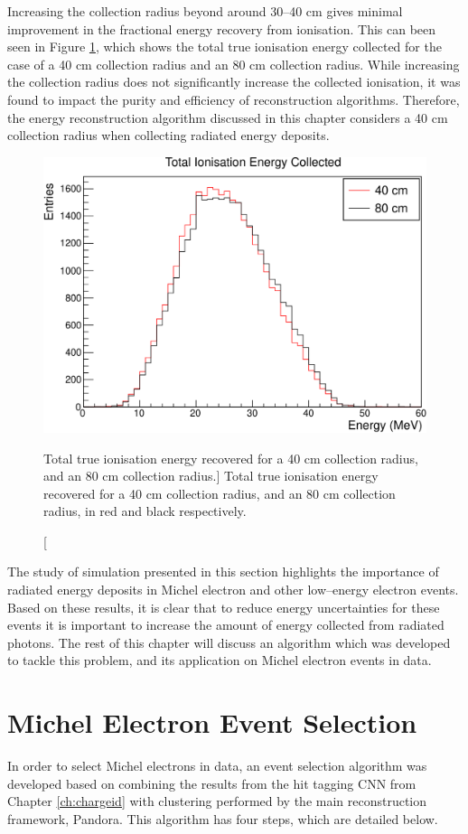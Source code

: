 Increasing the collection radius beyond around 30--40 cm gives minimal
improvement in the fractional energy recovery from ionisation. This can been
seen in Figure \ref{fig:40_v_80}, which shows the total true ionisation energy
collected for the case of a 40 cm collection radius and an 80 cm collection
radius. While increasing the collection radius does not significantly increase
the collected ionisation, it was found to impact the purity and efficiency of
reconstruction algorithms. Therefore, the energy reconstruction algorithm
discussed in this chapter considers a 40 cm collection radius when collecting
radiated energy deposits.
\begin{figure}
	\centering
	\includegraphics[width=\textwidth]{figures/40_v_80.pdf}
	\caption
	[Total true ionisation energy recovered for a 40 cm collection radius, and an
	80 cm collection radius.]
	{Total true ionisation energy recovered for a 40 cm collection radius, and an
	80 cm collection radius, in red and black respectively.}
	\label{fig:40_v_80}
\end{figure}

The study of \protodune{} simulation presented in this section highlights the 
importance of radiated energy deposits in Michel electron and other 
low--energy electron events. Based on these results, it is clear that to 
reduce energy uncertainties for these events it is important to increase the 
amount of energy collected from radiated photons. The rest of this chapter 
will discuss an algorithm which was developed to tackle this problem, and its 
application on Michel electron events in \protodune{} data.

\section{Michel Electron Event Selection} \label{ME_ES}
In order to select Michel electrons in \protodune{} data, an event selection
algorithm was developed based on combining the results from the hit tagging CNN
from Chapter \ref{ch:chargeid} with clustering performed by the main
\protodune{} reconstruction framework, Pandora. This algorithm has four steps,
which are detailed below.

